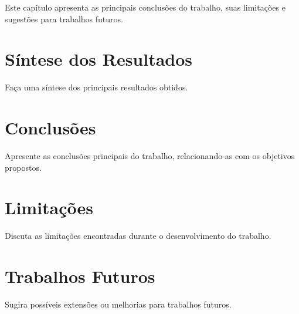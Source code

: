 \documentclass[12pt, a4paper, brazil, oneside]{abntex2}
\begin{document}
Este capítulo apresenta as principais conclusões do trabalho, suas limitações e sugestões para trabalhos futuros.

\section{Síntese dos Resultados}

Faça uma síntese dos principais resultados obtidos.

\section{Conclusões}

Apresente as conclusões principais do trabalho, relacionando-as com os objetivos propostos.

\section{Limitações}

Discuta as limitações encontradas durante o desenvolvimento do trabalho.

\section{Trabalhos Futuros}

Sugira possíveis extensões ou melhorias para trabalhos futuros.


\postextual

\newpage



\end{document}
